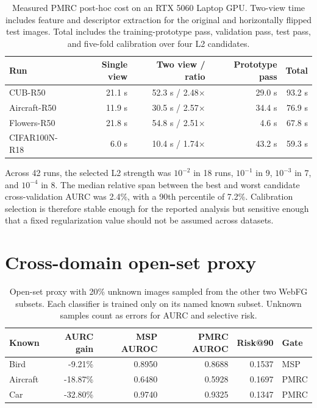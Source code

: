 \documentclass[11pt,a4paper]{article}
\begin{document}
\begin{table}[H]
\centering
\caption{Measured PMRC post-hoc cost on an RTX 5060 Laptop GPU. Two-view time includes feature and descriptor extraction for the original and horizontally flipped test images. Total includes the training-prototype pass, validation pass, test pass, and five-fold calibration over four L2 candidates.}
\label{tab:posthoc-cost}
\footnotesize
\setlength{\tabcolsep}{3pt}
\begin{tabular}{@{}lrrrr@{}}
\toprule
Run & Single view & Two view / ratio & Prototype pass & Total \\
\midrule
CUB-R50 & 21.1 s & 52.3 s / 2.48$\times$ & 29.0 s & 93.2 s \\
Aircraft-R50 & 11.9 s & 30.5 s / 2.57$\times$ & 34.4 s & 76.9 s \\
Flowers-R50 & 21.8 s & 54.8 s / 2.51$\times$ & 4.6 s & 67.8 s \\
CIFAR100N-R18 & 6.0 s & 10.4 s / 1.74$\times$ & 43.2 s & 59.3 s \\
\bottomrule
\end{tabular}
\end{table}

Across 42 runs, the selected L2 strength was $10^{-2}$ in 18 runs,
$10^{-1}$ in 9, $10^{-3}$ in 7, and $10^{-4}$ in 8. The median relative span
between the best and worst candidate cross-validation AURC was 2.4\%, with a
90th percentile of 7.2\%. Calibration selection is therefore stable enough for
the reported analysis but sensitive enough that a fixed regularization value
should not be assumed across datasets.

\section{Cross-domain open-set proxy}

\begin{table}[H]
\centering
\caption{Open-set proxy with 20\% unknown images sampled from the other two WebFG subsets. Each classifier is trained only on its named known subset. Unknown samples count as errors for AURC and selective risk.}
\label{tab:openset-proxy}
\small
\begin{tabular}{@{}lrrrrl@{}}
\toprule
Known & AURC gain & MSP AUROC & PMRC AUROC & Risk@90 & Gate \\
\midrule
Bird & -9.21\% & 0.8950 & 0.8688 & 0.1537 & MSP \\
Aircraft & -18.87\% & 0.6480 & 0.5928 & 0.1697 & PMRC \\
Car & -32.80\% & 0.9740 & 0.9325 & 0.1347 & PMRC \\
\bottomrule
\end{tabular}
\end{table}
\end{document}
